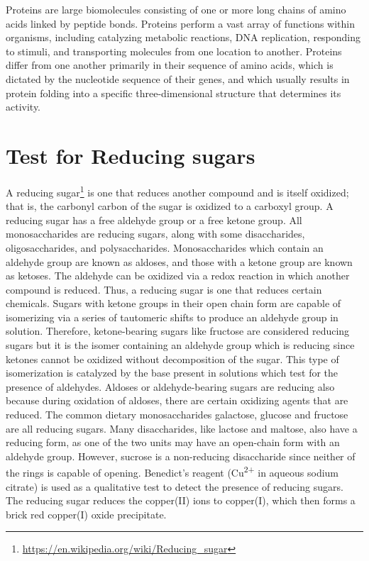 \documentclass[]{book}
\let\rmarkdownfootnote\footnote%
\def\footnote{\protect\rmarkdownfootnote}
\renewcommand{\href}[2]{#2\footnote{\url{#1}}}
\begin{document}
Proteins are large biomolecules consisting of one or more long chains of amino acids linked by peptide bonds. Proteins perform a vast array of functions within organisms, including catalyzing metabolic reactions, DNA replication, responding to stimuli, and transporting molecules from one location to another. Proteins differ from one another primarily in their sequence of amino acids, which is dictated by the nucleotide sequence of their genes, and which usually results in protein folding into a specific three-dimensional structure that determines its activity.

\hypertarget{test-for-reducing-sugars}{%
\section{Test for Reducing sugars}\label{test-for-reducing-sugars}}

A \href{https://en.wikipedia.org/wiki/Reducing_sugar}{reducing sugar} is one that reduces another compound and is itself oxidized; that is, the carbonyl carbon of the sugar is oxidized to a carboxyl group. A reducing sugar has a free aldehyde group or a free ketone group. All monosaccharides are reducing sugars, along with some disaccharides, oligosaccharides, and polysaccharides. Monosaccharides which contain an aldehyde group are known as aldoses, and those with a ketone group are known as ketoses. The aldehyde can be oxidized via a redox reaction in which another compound is reduced. Thus, a reducing sugar is one that reduces certain chemicals. Sugars with ketone groups in their open chain form are capable of isomerizing via a series of tautomeric shifts to produce an aldehyde group in solution. Therefore, ketone-bearing sugars like fructose are considered reducing sugars but it is the isomer containing an aldehyde group which is reducing since ketones cannot be oxidized without decomposition of the sugar. This type of isomerization is catalyzed by the base present in solutions which test for the presence of aldehydes. Aldoses or aldehyde-bearing sugars are reducing also because during oxidation of aldoses, there are certain oxidizing agents that are reduced. The common dietary monosaccharides galactose, glucose and fructose are all reducing sugars. Many disaccharides, like lactose and maltose, also have a reducing form, as one of the two units may have an open-chain form with an aldehyde group. However, sucrose is a non-reducing disaccharide since neither of the rings is capable of opening.
Benedict's reagent (Cu\textsuperscript{2+} in aqueous sodium citrate) is used as a qualitative test to detect the presence of reducing sugars. The reducing sugar reduces the copper(II) ions to copper(I), which then forms a brick red copper(I) oxide precipitate.
\end{document}
